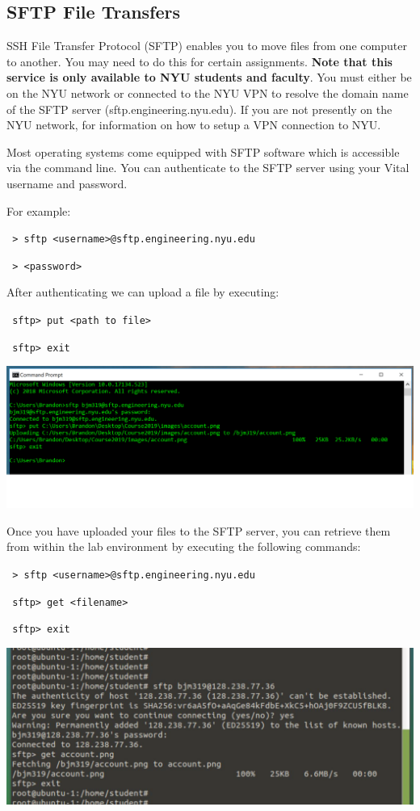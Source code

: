 \documentclass[12pt]{article}
\newcommand{\MYhref}[3][blue]{\href{#2}{\color{#1}{#3}}}%
\begin{document}
\subsection*{SFTP File Transfers}
SSH File Transfer Protocol (SFTP) enables you to move files from one computer to another. You may need to do this for certain assignments. \textbf{Note that this service is only available to NYU students and faculty}. You must either be on the NYU network or connected to the NYU VPN to resolve the domain name of the SFTP server (sftp.engineering.nyu.edu). If you are not presently on the NYU network, \MYhref{https://www.nyu.edu/life/information-technology/getting-started/network-and-connectivity/vpn.html}{click here} for information on how to setup a VPN connection to NYU.

Most operating systems come equipped with SFTP software which is accessible via the command line. You can authenticate to the SFTP server using your Vital username and password.

For example:
\begin{adjustwidth}{2.5em}{0pt}
\texttt{
> sftp <username>@sftp.engineering.nyu.edu
}

\texttt{
> <password>
}
\end{adjustwidth}


After authenticating we can upload a file by executing:
\begin{adjustwidth}{2.5em}{0pt}
\texttt{
sftp> put <path to file>
}

\texttt{
sftp> exit
}
\end{adjustwidth}
{%
\centering
\includegraphics[width=\linewidth]{sftp1.png}

}


Once you have uploaded your files to the SFTP server, you can retrieve them from within the lab environment by executing the following commands:
\begin{adjustwidth}{2.5em}{0pt}
\texttt{
> sftp <username>@sftp.engineering.nyu.edu
}

\texttt{
sftp> get <filename>
}

\texttt{
sftp> exit
}
\end{adjustwidth}
{%
\centering
\includegraphics[width=\linewidth]{sftp2.png}

}
\end{document}
